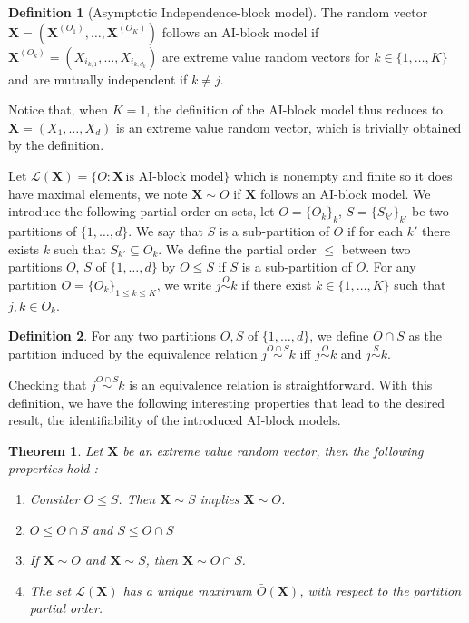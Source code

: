 \documentclass[11pt]{article}
\newtheorem{theorem}{Theorem}
\theoremstyle{definition}
\newtheorem{definition}{Definition}
\begin{document}
	\begin{definition}[Asymptotic Independence-block model]
		 The random vector $\textbf{X} = (\textbf{X}^{(O_1)}, \dots, \textbf{X}^{(O_K)})$ follows an AI-block model if $\textbf{X}^{(O_k)} = (X_{i_{k,1}}, \dots, X_{i_{k,d_k}})$ are extreme value random vectors for $k \in \{1,\dots,K\}$ and are mutually independent if $k \neq j$.
	\end{definition}
	
	Notice that, when $K=1$, the definition of the AI-block model thus reduces to $\textbf{X} = (X_1,\dots,X_d)$ is an extreme value random vector, which is trivially obtained by the definition. 
	
	Let $\mathcal{L}(\textbf{X}) = \{O : \textbf{X} \, \textrm{is AI-block model}\}$ which is nonempty and finite so it does have maximal elements, we note $\textbf{X} \sim O$ if $\textbf{X}$ follows an AI-block model. We introduce the following partial order on sets, let $O = \{O_k\}_k$, $S = \{S_{k'}\}_{k'}$ be two partitions of $\{1,\dots,d\}$. We say that $S$ is a sub-partition of $O$ if for each $k'$ there exists $k$ such that $S_{k'} \subseteq O_k$. We define the partial order $\leq$ between two partitions $O$, $S$ of $\{1,\dots,d\}$ by $O \leq S$ if $S$ is a sub-partition of $O$. For any partition $O = \{O_k\}_{1 \leq k \leq K}$, we write $j \overset{O}{\sim} k$ if there exist $k \in \{1,\dots,K\}$ such that $j,k \in O_k$.
	
	\begin{definition}
		For any two partitions $O, S$ of $\{1,\dots,d\}$, we define $O \cap S$ as the partition induced by the equivalence relation $j \overset{O \cap S}{\sim} k$ iff $j \overset{O}{\sim} k$ and $j \overset{S}{\sim} k$.
	\end{definition}
	Checking that $j \overset{O \cap S}{\sim} k$ is an equivalence relation is straightforward. With this definition, we have the following interesting properties that lead to the desired result, the identifiability of the introduced AI-block models.
	\begin{theorem}
		\label{thm:unicity}
		Let $\textbf{X}$ be an extreme value random vector, then the following properties hold :
		\begin{enumerate}
			\item Consider $O \leq S$. Then $\textbf{X} \sim S$ implies $\textbf{X} \sim O$.
			\item $O \leq O\cap S$ and $S \leq O \cap S$
			\item If $\textbf{X} \sim O$ and $\textbf{X} \sim S$, then  $\textbf{X} \sim O \cap S$.
			\item The set $\mathcal{L}(\textbf{X})$ has a unique maximum $\bar{O}(\textbf{X})$, with respect to the partition partial order.
		\end{enumerate}
	\end{theorem}
	
\end{document}
